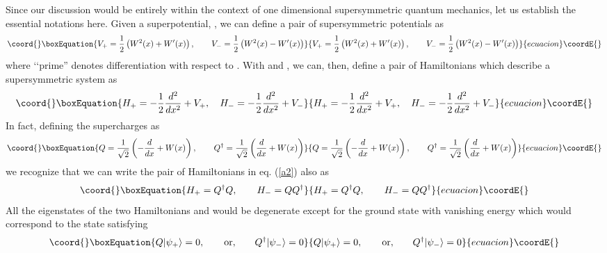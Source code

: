 \documentclass[a4paper,11pt]{article}
\begin{document}
Since our discussion would be entirely within the context of one
dimensional supersymmetric quantum mechanics, let us establish the
essential notations here. Given a superpotential, \coordHE{}, we can
define a pair of supersymmetric potentials as
\begin{equation}\coord{}\boxEquation{
 V_{+} = {1\over 2}\left(W^{2}(x) + W'(x)\right),\qquad V_{-} =
 {1\over 2}\left(W^{2}(x) - W'(x)\right)\label{a1}
}{
 V_{+} = {1\over 2}\left(W^{2}(x) + W'(x)\right),\qquad V_{-} =
 {1\over 2}\left(W^{2}(x) - W'(x)\right)}{ecuacion}\coordE{}\end{equation}
where \lq\lq prime'' denotes differentiation with respect to \coordHE{}. With
\coordHE{} and \coordHE{}, we can, then, define a pair of Hamiltonians
which describe a supersymmetric system as
\begin{equation}\coord{}\boxEquation{
H_{+} = - {1\over 2}\frac{d^{2}}{dx^{2}} + V_{+},\quad
H_{-} = - {1\over 2}\frac{d^{2}}{dx^{2}} + V_{-}\label{a2}
}{
H_{+} = - {1\over 2}\frac{d^{2}}{dx^{2}} + V_{+},\quad
H_{-} = - {1\over 2}\frac{d^{2}}{dx^{2}} + V_{-}}{ecuacion}\coordE{}\end{equation}
In fact, defining the supercharges as
\begin{equation}\coord{}\boxEquation{
Q = {1\over\sqrt{2}}\left(-\frac{d}{dx} + W(x)\right), \qquad
Q^{\dagger} = {1\over\sqrt{2}}\left(\frac{d}{dx} + W(x)\right)\label{a3}
}{
Q = {1\over\sqrt{2}}\left(-\frac{d}{dx} + W(x)\right), \qquad
Q^{\dagger} = {1\over\sqrt{2}}\left(\frac{d}{dx} + W(x)\right)}{ecuacion}\coordE{}\end{equation}
we recognize that we can write the pair of Hamiltonians in
eq. (\ref{a2}) also as
\begin{equation}\coord{}\boxEquation{
H_{+} = Q^{\dagger}Q, \qquad H_{-} = QQ^{\dagger}\label{a4}
}{
H_{+} = Q^{\dagger}Q, \qquad H_{-} = QQ^{\dagger}}{ecuacion}\coordE{}\end{equation}
All the
eigenstates of the two Hamiltonians \coordHE{} and \coordHE{} would be
degenerate except for the ground state with vanishing energy which
would correspond to the state satisfying
\begin{equation}\coord{}\boxEquation{
Q|\psi_{+}\rangle = 0, \qquad {\rm or,}\qquad Q^{\dagger}|\psi_{-}\rangle =
0\label{a6} 
}{
Q|\psi_{+}\rangle = 0, \qquad {\rm or,}\qquad Q^{\dagger}|\psi_{-}\rangle =
0}{ecuacion}\coordE{}\end{equation}
\end{document}
